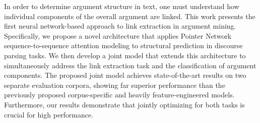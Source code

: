 In order to determine argument structure in text, one must understand how individual components of the overall argument are linked. This work presents the first neural network-based approach to link extraction in argument mining. Specifically, we propose a novel architecture that applies Pointer Network sequence-to-sequence attention modeling to structural prediction in discourse parsing tasks. We then develop a joint model that extends this architecture to simultaneously address the link extraction task and the classification of argument components. The proposed joint model achieves state-of-the-art results on two separate evaluation corpora, showing far superior performance than the previously proposed corpus-specific and heavily feature-engineered models. Furthermore, our results demonstrate that jointly optimizing for both tasks is crucial for high performance.
